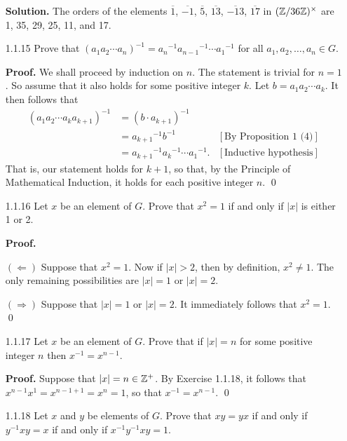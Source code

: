 \begin{enumerate}
      \textbf{Solution.} The orders of the elements $\overline{1}$,
      $\overline{-1}$, $\overline{5}$, $\overline{13}$, $\overline{-13}$,
      $\overline{17}$ in $(\mathbb{Z}/36\mathbb{Z})^\times$ are 1, 35, 29, 25, 11, and 17.
   \item[1.1.15]  Prove that $(a_1a_2\cdots a_n)^{-1} =
                  {a_n}^{-1}{a_{n-1}}^{-1}\cdots {a_1}^{-1}$ for all
                  $a_1, a_2, \ldots, a_n \in G$.
                  
      \textbf{Proof.} We shall proceed by induction on $n$. The statement is
      trivial for $n = 1$. So assume that it also holds for some positive
      integer $k$. Let $b = a_1a_2\cdots a_k$. It then follows that
      \begin{align*}
         (a_1a_2\cdots a_ka_{k+1})^{-1} &= (b \cdot a_{k+1})^{-1} \\
            &= {a_{k+1}}^{-1}b^{-1} &[\text{By Proposition 1 (4)}] \\
            &= {a_{k+1}}^{-1}{a_k}^{-1}\cdots {a_1}^{-1}.
                  &[\text{Inductive hypothesis}]
      \end{align*}
      That is, our statement holds for $k + 1$, so that, by the Principle of
      Mathematical Induction, it holds for each positive integer $n$. \qed
   \item[1.1.16]  Let $x$ be an element of $G$. Prove that $x^2 = 1$ if and only
                  if $|x|$ is either 1 or 2.
                  
      \textbf{Proof.}
      
      $(\Leftarrow)$ Suppose that $x^2 = 1$. Now if $|x| > 2$, then by
      definition, $x^2 \neq 1$. The only remaining possibilities are $|x| = 1$
      or $|x| = 2$.
      
      $(\Rightarrow)$ Suppose that $|x| = 1$ or $|x| = 2$. It immediately
      follows that $x^2 = 1$. \qed
   \item[1.1.17]  Let $x$ be an element of $G$. Prove that if $|x| = n$ for some
                  positive integer $n$ then $x^{-1} = x^{n-1}$.
                  
      \textbf{Proof.} Suppose that $|x| = n \in \mathbb{Z}^+$. By Exercise 1.1.18, it
      follows that $x^{n-1}x^1 = x^{n-1+1} = x^n = 1$, so that
      $x^{-1} = x^{n-1}$. \qed      
   \item[1.1.18]  Let $x$ and $y$ be elements of $G$. Prove that $xy = yx$ if
                  and only if $y^{-1}xy =x$ if and only if $x^{-1}y^{-1}xy = 1$.
                  

\end{enumerate}
